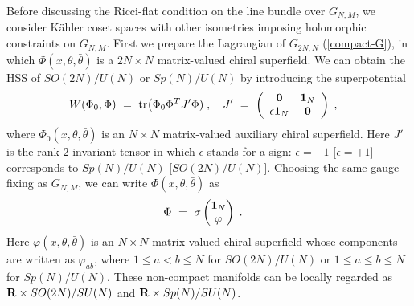 \documentclass[a4paper,11pt]{article}
\newcommand{\kahler}{K\"{a}hler }
\newcommand{\tr}{{\rm tr}}
\begin{document}
{Before discussing the Ricci-flat condition on 
the line bundle over $G_{N,M}$,  
we consider \kahler coset spaces with other isometries 
imposing holomorphic constraints on $G_{N,M}$. 
First we prepare the Lagrangian of $G_{2N,N}$ 
(\ref{compact-G}), 
in which $\Phi( x, \theta, \bar{\theta})$ is 
a $2N \times N$ matrix-valued chiral superfield.  
We can obtain the HSS of 
$SO(2N)/U(N)$ or $Sp(N)/U(N)$ by introducing 
the superpotential  
\begin{align}
W (\Phi_0, \Phi) 
\ &= \ 
\tr \big( \Phi_0 \Phi^T J' \Phi) \; , \ \ \ 
J' \ = \ \left(
\begin{array}{cc}
{\bf 0} & {\bf 1}_N \\
\epsilon {\bf 1}_N & {\bf 0}
\end{array} \right) \; ,
\end{align}
where $\Phi_0 (x, \theta, \bar{\theta})$ is 
an $N \times N$ matrix-valued
auxiliary chiral superfield. 
Here $J'$ is the rank-$2$ invariant tensor in which 
$\epsilon$ stands for a sign: 
$\epsilon = -1$ [$\epsilon = +1$] 
corresponds to $Sp(N)/U(N)$ [$SO(2N)/U(N)$]. 
Choosing the same gauge fixing as $G_{N,M}$,
we can write $\Phi(x, \theta, \bar{\theta})$ as
\begin{align}
\Phi \ &= \ \sigma \begin{pmatrix}
  {\bf 1}_N \cr
  \varphi
 \end{pmatrix} \; . \label{gf-Phi-so-sp}
\end{align}
Here
$\varphi(x, \theta, \bar{\theta})$ is an $N \times N$ matrix-valued
chiral superfield whose components are written as $\varphi_{a b}$,
where $1 \leq a < b \leq N$ for $SO(2N)/U(N)$ 
or $1 \leq a \leq b \leq N$ for $Sp(N)/U(N)$.
These non-compact manifolds can be locally regarded as
${\bf R} \times SO(2N)/SU(N)$ and ${\bf R} \times Sp(N)/SU(N)$.

}
\end{document}
